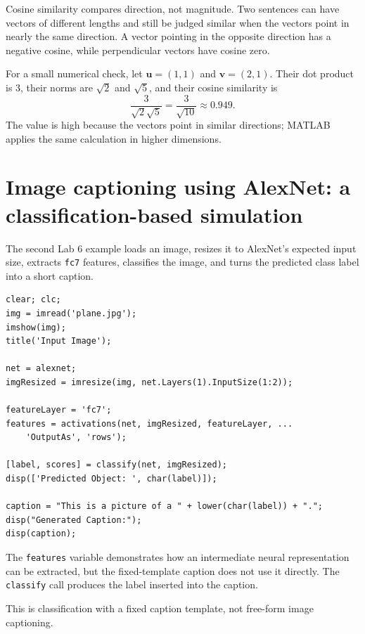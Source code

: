 Cosine similarity compares direction, not magnitude. Two sentences can have vectors of different lengths and still be judged similar when the vectors point in nearly the same direction. A vector pointing in the opposite direction has a negative cosine, while perpendicular vectors have cosine zero.

\begin{workedexample}
For a small numerical check, let \(\mathbf{u}=(1,1)\) and \(\mathbf{v}=(2,1)\). Their dot product is 3, their norms are \(\sqrt{2}\) and \(\sqrt{5}\), and their cosine similarity is
\[
\frac{3}{\sqrt{2}\sqrt{5}}=\frac{3}{\sqrt{10}}\approx0.949.
\]
The value is high because the vectors point in similar directions; MATLAB applies the same calculation in higher dimensions.
\end{workedexample}

\section{Image captioning using AlexNet: a classification-based simulation}

The second Lab 6 example loads an image, resizes it to AlexNet's expected input size, extracts \texttt{fc7} features, classifies the image, and turns the predicted class label into a short caption.

\begin{lstlisting}[style=mlmatlab]
clear; clc;
img = imread('plane.jpg');
imshow(img);
title('Input Image');

net = alexnet;
imgResized = imresize(img, net.Layers(1).InputSize(1:2));

featureLayer = 'fc7';
features = activations(net, imgResized, featureLayer, ...
    'OutputAs', 'rows');

[label, scores] = classify(net, imgResized);
disp(['Predicted Object: ', char(label)]);

caption = "This is a picture of a " + lower(char(label)) + ".";
disp("Generated Caption:");
disp(caption);
\end{lstlisting}

The \texttt{features} variable demonstrates how an intermediate neural representation can be extracted, but the fixed-template caption does not use it directly. The \texttt{classify} call produces the label inserted into the caption.

\begin{pitfall}
This is classification with a fixed caption template, not free-form image captioning.
\end{pitfall}

